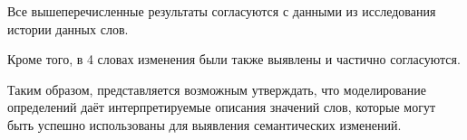 \documentclass[LI,VKR]{HSEUniversity}
\begin{document}
Все вышеперечисленные результаты согласуются с данными из исследования истории данных слов.

Кроме того, в 4 словах изменения были также выявлены и частично согласуются.

Таким образом, представляется возможным утверждать, что моделирование определений даёт
интерпретируемые описания значений слов, которые могут быть успешно использованы
для выявления семантических изменений.

%
%
%
\end{document}
